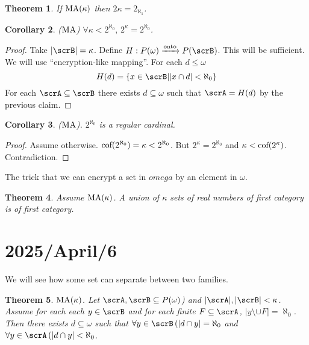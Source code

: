 \documentclass[11pt,pdftex,twoside,a4paper]{article}
\newcommand{\MA}{\ensuremath{\mathop{\rm MA}\nolimits}}
\newtheorem{thm}{Theorem}[section]
\newtheorem{corollary}[thm]{Corollary}
\theoremstyle{definition}
\begin{document}
\begin{thm}
If \(\MA(\kappa)\) then \(2\kappa = 2_{\aleph_1}\).
\end{thm}
\begin{corollary}
(\(\MA\)) \(\forall \kappa < 2^{\aleph_0},\,2^\kappa = 2^{\aleph_0}\).
\end{corollary}
\begin{proof}
Take \(|\scrB|=\kappa\).
Define \(H: P(\omega) \xrightarrow{\text{onto}} P(\scrB)\).
This will be sufficient. We will use ``encryption-like mapping''.
For each \(d\leq\omega\)
\begin{equation*}
H(d) = \{x\in\scrB| |x\cap d| < \aleph_0\}
\end{equation*}
For each \(\scrA\subseteq\scrB\) there exists \(d\subseteq\omega\)
such that \(\scrA = H(d)\) by the previous claim.
\end{proof}
\begin{corollary}
 (\MA). \(2^{\aleph_0}\) is a regular cardinal.
\end{corollary}
\begin{proof}
Assume otherwise. \(\textnormal{cof}(2^{\aleph_0})=\kappa < 2^{\aleph_0}\).
But \(2^\kappa = 2^{\aleph_0}\) and \(\kappa < \textnormal{cof}(2^\kappa)\).
Contradiction.
\end{proof}

The trick that we can encrypt a set in \(omega\) by an element in \(\omega\).

\begin{thm}
Assume \(\MA(\kappa)\).
A union of \(\kappa\) sets of real numbers of first category
is of first category.
\end{thm}


\section{2025/April/6}


We will see how some set can separate between two families.

\begin{thm} \label{thm:MAk:AB:sepd}
\(\MA(\kappa)\).
Let \(\scrA,\scrB \subseteq P(\omega)\)) and \(|\scrA|,|\scrB| < \kappa\).
Assume for each each \(y\in\scrB\) and for each finite \(F\subseteq \scrA\),
\(|y \setminus \cup F|=\aleph_0\).
Then there exists \(d\subseteq \omega\) such that 
\(\forall y\in\scrB\,(|d\cap y|=\aleph_0\) and
\(\forall y\in\scrA\,(|d\cap y|<\aleph_0\).
\end{thm}
\end{document}
